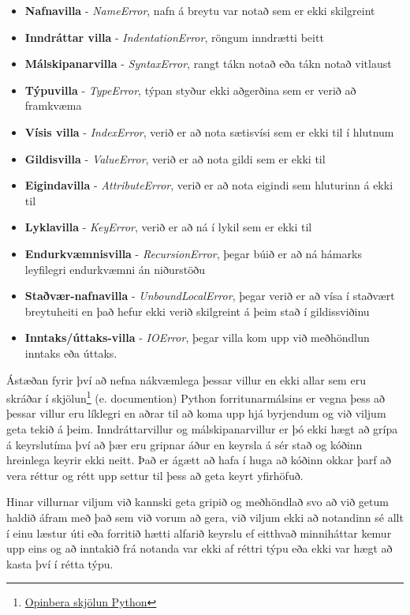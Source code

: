 \begin{itemize}
	\item \textbf{Nafnavilla} - \emph{NameError}, nafn á breytu var notað sem er ekki skilgreint
	\item \textbf{Inndráttar villa }- \emph{IndentationError}, röngum inndrætti beitt
	\item \textbf{Málskipanarvilla} - \emph{SyntaxError}, rangt tákn notað eða tákn notað vitlaust
	\item \textbf{Týpuvilla} - \emph{TypeError}, týpan styður ekki aðgerðina sem er verið að framkvæma
	\item \textbf{Vísis villa} - \emph{IndexError}, verið er að nota sætisvísi sem er ekki til í hlutnum
	\item \textbf{Gildisvilla} - \emph{ValueError}, verið er að nota gildi sem er ekki til
	\item \textbf{Eigindavilla} - \emph{AttributeError}, verið er að nota eigindi sem hluturinn á ekki til
	\item \textbf{Lyklavilla} - \emph{KeyError}, verið er að ná í lykil sem er ekki til
	\item \textbf{Endurkvæmnisvilla} - \emph{RecursionError}, þegar búið er að ná hámarks leyfilegri endurkvæmni án niðurstöðu
	\item \textbf{Staðvær-nafnavilla} - \emph{UnboundLocalError}, þegar verið er að vísa í staðvært breytuheiti en það hefur ekki verið skilgreint á þeim stað í gildissviðinu
	\item \textbf{Inntaks/úttaks-villa} - \emph{IOError}, þegar villa kom upp við meðhöndlun inntaks eða úttaks.
\end{itemize}
\vspace{0.5cm}
Ástæðan fyrir því að nefna nákvæmlega þessar villur en ekki allar sem eru skráðar í skjölun\footnote{\href{https://docs.python.org/}{Opinbera skjölun Python}} (e. documention) Python forritunarmálsins er vegna þess að þessar villur eru líklegri en aðrar til að koma upp hjá byrjendum og við viljum geta tekið á þeim.
Inndráttarvillur og málskipanarvillur er þó ekki hægt að grípa á keyrslutíma því að þær eru gripnar áður en keyrsla á sér stað og kóðinn hreinlega keyrir ekki neitt.
Það er ágætt að hafa í huga að kóðinn okkar þarf að vera réttur og rétt upp settur til þess að geta keyrt yfirhöfuð.

Hinar villurnar viljum við kannski geta gripið og meðhöndlað svo að við getum haldið áfram með það sem við vorum að gera, við viljum ekki að notandinn sé allt í einu læstur úti eða forritið hætti alfarið keyrslu ef eitthvað minniháttar kemur upp eins og að inntakið frá notanda var ekki af réttri týpu eða ekki var hægt að kasta því í rétta týpu.

